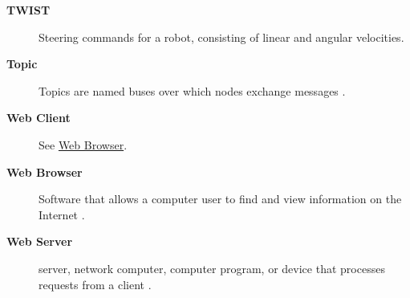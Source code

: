 \begin{description}
	\item[\textbf{TWIST}]
	Steering commands for a robot, consisting of linear and angular velocities.

	\item[\textbf{Topic}]
	Topics are named buses over which nodes exchange messages \autocite{TOPICDEFINITION}.

	\item[\textbf{Web Client}]
	\label{itm:webclient}
	See \hyperref[Web Browser]{Web Browser}.

	\item[\textbf{Web Browser}]
	Software that allows a computer user to find and view information on the Internet \autocite{BROWSERDICTIONARY}.

	\item[\textbf{Web Server}]
	server, network computer, computer program, or device that processes requests from a client \autocite{WEBSERVERDICTIONARY}.

\end{description}